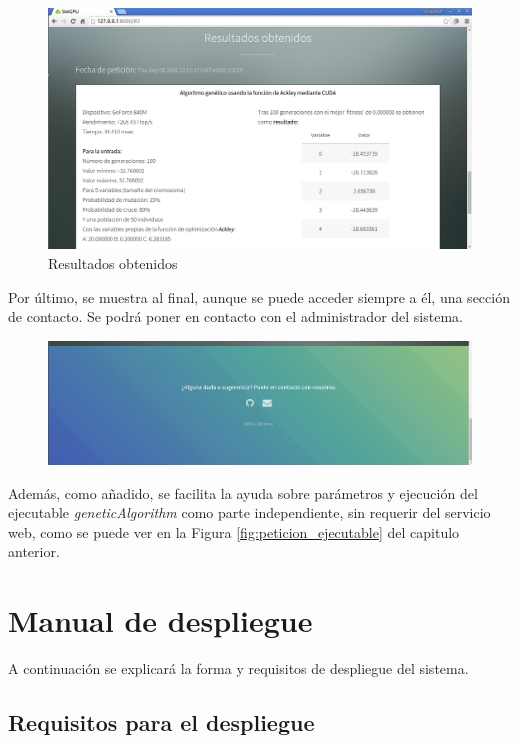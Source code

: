 \bigskip
\begin{figure}[h]
	\centering
	\includegraphics[width=1\linewidth]{../images/captura_web_4}
	\caption[Resultados obtenidos]{Resultados obtenidos}
	\label{fig:captura_web_4}
\end{figure}


\newpage
\bigskip
Por último, se muestra al final, aunque se puede acceder siempre a él, una sección de contacto. Se podrá poner en contacto con el administrador del sistema.

\bigskip
\begin{figure}[h]
	\centering
	\includegraphics[width=0.9\linewidth]{../images/captura_web_5}
	\caption[ ]{ }
	\label{fig:captura_web_5}
\end{figure}


\bigskip
Además, como añadido, se facilita la ayuda sobre parámetros y ejecución del ejecutable \textit{geneticAlgorithm} como parte independiente, sin requerir del servicio web, como se puede ver en la Figura \ref{fig:peticion_ejecutable} del capitulo anterior.


\newpage
\section{Manual de despliegue}
\bigskip

A continuación se explicará la forma y requisitos de despliegue del sistema. 

\subsection{Requisitos para el despliegue}
\bigskip

